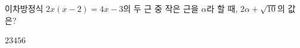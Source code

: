이차방정식 $2x(x-2)=4x-3$의 두 근 중 작은 근을 $\alpha$라 할 때, $2\alpha+\sqrt{10}$의 값은?
\begin{choices32}{$2$}{$3$}{$4$}{$5$}{$6$}\end{choices32}
